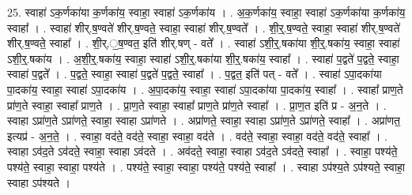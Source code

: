 \documentclass[17pt]{extarticle}
\begin{document}
25. स्वाहा॑ ऽक॒र्णका॑या क॒र्णका॑य॒ स्वाहा॒ स्वाहा॑ ऽक॒र्णका॑य । . अ॒क॒र्णका॑य॒ स्वाहा॒ स्वाहा॑ ऽक॒र्णका॑या क॒र्णका॑य॒ स्वाहा᳚ । . स्वाहा॑ शीर्.ष॒ण्वते॑ शीर्.ष॒ण्वते॒ स्वाहा॒ स्वाहा॑ शीर्.ष॒ण्वते᳚ । . शी॒र्॒.ष॒ण्वते॒ स्वाहा॒ स्वाहा॑ शीर्.ष॒ण्वते॑ शीर्.ष॒ण्वते॒ स्वाहा᳚ । . शी॒र्.॒ष॒ण्वत॒ इति॑ शीर्.षण् - वते᳚ । . स्वाहा॑ ऽशी॒र्॒.षका॑या शी॒र्॒.षका॑य॒ स्वाहा॒ स्वाहा॑ ऽशी॒र्॒.षका॑य । . अ॒शी॒र्॒.षका॑य॒ स्वाहा॒ स्वाहा॑ ऽशी॒र्॒.षका॑या शी॒र्॒.षका॑य॒ स्वाहा᳚ । . स्वाहा॑ प॒द्वते॑ प॒द्वते॒ स्वाहा॒ स्वाहा॑ प॒द्वते᳚ । . प॒द्वते॒ स्वाहा॒ स्वाहा॑ प॒द्वते॑ प॒द्वते॒ स्वाहा᳚ । . प॒द्वत॒ इति॑ पत् - वते᳚ । . स्वाहा॑ ऽपा॒दका॑या पा॒दका॑य॒ स्वाहा॒ स्वाहा॑ ऽपा॒दका॑य । . अ॒पा॒दका॑य॒ स्वाहा॒ स्वाहा॑ ऽपा॒दका॑या पा॒दका॑य॒ स्वाहा᳚ । . स्वाहा᳚ प्राण॒ते प्रा॑ण॒ते स्वाहा॒ स्वाहा᳚ प्राण॒ते । . प्रा॒ण॒ते स्वाहा॒ स्वाहा᳚ प्राण॒ते प्रा॑ण॒ते स्वाहा᳚ । . प्रा॒ण॒त इति॑ प्र - अ॒न॒ते । . स्वाहा ऽप्रा॑ण॒ते ऽप्रा॑णते॒ स्वाहा॒ स्वाहा ऽप्रा॑णते । . अप्रा॑णते॒ स्वाहा॒ स्वाहा ऽप्रा॑ण॒ते ऽप्रा॑णते॒ स्वाहा᳚ । . अप्रा॑णत॒ इत्यप्र॑ - अ॒न॒ते॒ । . स्वाहा॒ वद॑ते॒ वद॑ते॒ स्वाहा॒ स्वाहा॒ वद॑ते । . वद॑ते॒ स्वाहा॒ स्वाहा॒ वद॑ते॒ वद॑ते॒ स्वाहा᳚ । . स्वाहा ऽव॑द॒ते ऽव॑दते॒ स्वाहा॒ स्वाहा ऽव॑दते । . अव॑दते॒ स्वाहा॒ स्वाहा ऽव॑द॒ते ऽव॑दते॒ स्वाहा᳚ । . स्वाहा॒ पश्य॑ते॒ पश्य॑ते॒ स्वाहा॒ स्वाहा॒ पश्य॑ते । . पश्य॑ते॒ स्वाहा॒ स्वाहा॒ पश्य॑ते॒ पश्य॑ते॒ स्वाहा᳚ । . स्वाहा ऽप॑श्य॒ते ऽप॑श्यते॒ स्वाहा॒ स्वाहा ऽप॑श्यते । \newline
\end{document}
